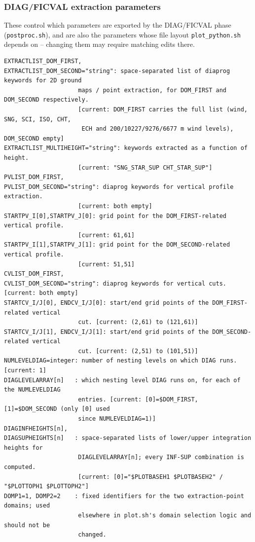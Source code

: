 \subsubsection{DIAG/FICVAL extraction parameters}
These control which parameters are exported by the DIAG/FICVAL phase (\texttt{postproc.sh}), and are
also the parameters whose file layout \texttt{plot\_python.sh} depends on -- changing them may require
matching edits there.
\begin{lstlisting}
EXTRACTLIST_DOM_FIRST,
EXTRACTLIST_DOM_SECOND="string": space-separated list of diaprog keywords for 2D ground
                     maps / point extraction, for DOM_FIRST and DOM_SECOND respectively.
                     [current: DOM_FIRST carries the full list (wind, SNG, SCI, ISO, CHT,
                      ECH and 200/10227/9276/6677 m wind levels), DOM_SECOND empty]
EXTRACTLIST_MULTIHEIGHT="string": keywords extracted as a function of height.
                     [current: "SNG_STAR_SUP CHT_STAR_SUP"]
PVLIST_DOM_FIRST,
PVLIST_DOM_SECOND="string": diaprog keywords for vertical profile extraction.
                     [current: both empty]
STARTPV_I[0],STARTPV_J[0]: grid point for the DOM_FIRST-related vertical profile.
                     [current: 61,61]
STARTPV_I[1],STARTPV_J[1]: grid point for the DOM_SECOND-related vertical profile.
                     [current: 51,51]
CVLIST_DOM_FIRST,
CVLIST_DOM_SECOND="string": diaprog keywords for vertical cuts. [current: both empty]
STARTCV_I/J[0], ENDCV_I/J[0]: start/end grid points of the DOM_FIRST-related vertical
                     cut. [current: (2,61) to (121,61)]
STARTCV_I/J[1], ENDCV_I/J[1]: start/end grid points of the DOM_SECOND-related vertical
                     cut. [current: (2,51) to (101,51)]
NUMLEVELDIAG=integer: number of nesting levels on which DIAG runs. [current: 1]
DIAGLEVELARRAY[n]   : which nesting level DIAG runs on, for each of the NUMLEVELDIAG
                     entries. [current: [0]=$DOM_FIRST, [1]=$DOM_SECOND (only [0] used
                     since NUMLEVELDIAG=1)]
DIAGINFHEIGHTS[n],
DIAGSUPHEIGHTS[n]   : space-separated lists of lower/upper integration heights for
                     DIAGLEVELARRAY[n]; every INF-SUP combination is computed.
                     [current: [0]="$PLOTBASEH1 $PLOTBASEH2" / "$PLOTTOPH1 $PLOTTOPH2"]
DOMP1=1, DOMP2=2    : fixed identifiers for the two extraction-point domains; used
                     elsewhere in plot.sh's domain selection logic and should not be
                     changed.
\end{lstlisting}
